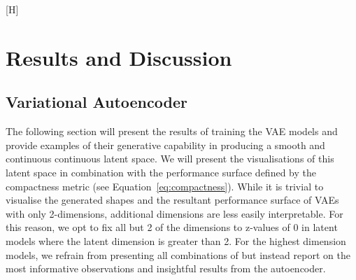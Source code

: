 \documentclass{article}
\begin{document}
\begin{table}[h]
\centering
{}
\caption{Genetic Algorithm Tested Optimisation Tasks for Latent Representations Shapes}
\label{tab:GA_models_latent}
\end{table}


\newpage{}[H]

\section{Results and Discussion}
\subsection{Variational Autoencoder}
The following section will present the results of training the VAE models and provide examples of their generative capability in producing a smooth and continuous continuous latent space. We will present the visualisations of this latent space in combination with the performance surface defined by the compactness metric (see Equation~\eqref{eq:compactness}). While it is trivial to visualise the generated shapes and the resultant performance surface of VAEs with only 2-dimensions, additional dimensions are less easily interpretable. For this reason, we opt to fix all but 2 of the dimensions to z-values of 0 in latent models where the latent dimension is greater than 2. For the highest dimension models, we refrain from presenting all combinations of but instead report on the most informative observations and insightful results from the autoencoder.
\end{document}
